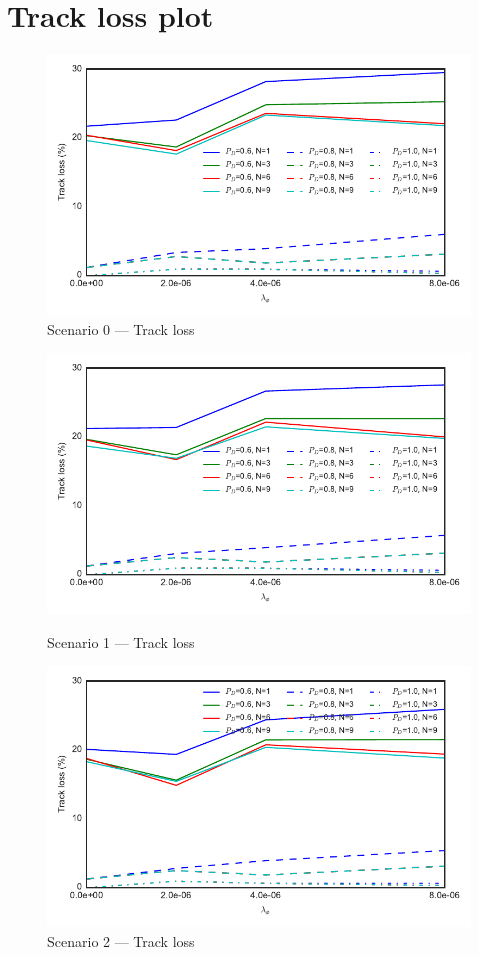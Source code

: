 
\chapter{Track loss plot}

\begin{figure}[H]
\centering
\includegraphics{Figures/plots/Scenario0_Tracking-TrackLoss.pdf}
\caption{Scenario 0 --- Track loss}\label{fig:scenario0_track_loss}
\end{figure}

\begin{figure}
\centering
\includegraphics{Figures/plots/Scenario1_Tracking-TrackLoss.pdf}
\caption{Scenario 1 --- Track loss}\label{fig:scenario1_track_loss}
\includegraphics{Figures/plots/Scenario2_Tracking-TrackLoss.pdf}
\caption{Scenario 2 --- Track loss}\label{fig:scenario2_track_loss}
\end{figure}

